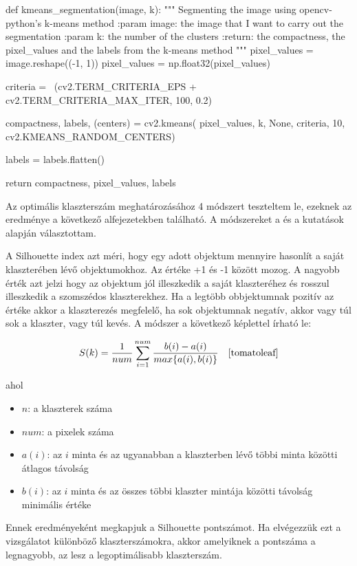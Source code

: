 \begin{python}
def kmeans_segmentation(image, k):
    """
    Segmenting the image using opencv-python's k-means method
    :param image: the image that I want to carry out the segmentation
    :param k: the number of the clusters
    :return: the compactness, the pixel_values and the labels
        from the k-means method
    """
    pixel_values = image.reshape((-1, 1))
    pixel_values = np.float32(pixel_values)

    criteria = \
        (cv2.TERM_CRITERIA_EPS + cv2.TERM_CRITERIA_MAX_ITER, 100, 0.2)

    compactness, labels, (centers) = cv2.kmeans(
        pixel_values,
        k,
        None,
        criteria,
        10,
        cv2.KMEANS_RANDOM_CENTERS)

    labels = labels.flatten()

    return compactness, pixel_values, labels
\end{python}


Az optimális klaszterszám meghatározásához 4 módszert teszteltem le, ezeknek az eredménye a következő alfejezetekben található.
A módszereket a \cite{tomatoleaf} és a \cite{elbow} kutatások alapján választottam.


A Silhouette index azt méri, hogy egy adott objektum mennyire hasonlít a saját klaszterében lévő objektumokhoz. Az értéke +1 és -1 között mozog. A nagyobb érték azt jelzi hogy az objektum jól illeszkedik a saját klaszteréhez és rosszul illeszkedik a szomszédos klaszterekhez. Ha a legtöbb obbjektumnak pozitív az értéke akkor a klaszterezés megfelelő, ha sok objektumnak negatív, akkor vagy túl sok a klaszter, vagy túl kevés. A módszer a következő képlettel írható le:

\[ S(k)=\frac{1}{num} \sum_{i=1}^{num} \frac{b(i)-a(i)}{max\{a(i),b(i)\}} \quad \cite{tomatoleaf} \]

ahol
\begin{itemize}
\item $n$: a klaszterek száma
\item $num$: a pixelek száma
\item $a(i)$: az $i$ minta és az ugyanabban a klaszterben lévő többi minta közötti átlagos távolság
\item $b(i)$: az $i$ minta és az összes többi klaszter mintája közötti távolság minimális értéke
\end{itemize}
Ennek eredményeként megkapjuk a Silhouette pontszámot. Ha elvégezzük ezt a vizsgálatot különböző klaszterszámokra, akkor amelyiknek a pontszáma a legnagyobb, az lesz a legoptimálisabb klaszterszám. 

